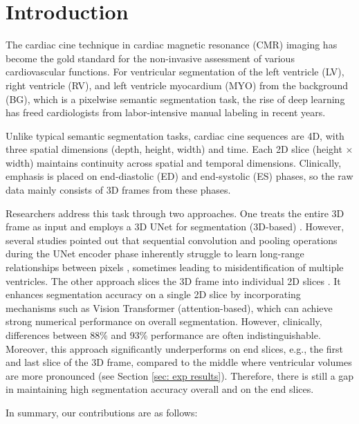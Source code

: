 \section{Introduction}
\label{sec:introduction}
The cardiac cine technique in cardiac magnetic resonance (CMR) imaging has become the gold standard for the non-invasive assessment of various cardiovascular functions\cite{ismail2022role}. For ventricular segmentation of the left ventricle (LV), right ventricle (RV), and left ventricle myocardium (MYO) from the background (BG), which is a pixelwise semantic segmentation task, the rise of deep learning has freed cardiologists from labor-intensive manual labeling in recent years.

Unlike typical semantic segmentation tasks, cardiac cine sequences are 4D, with three spatial dimensions (depth, height, width) and time. Each 2D slice (height × width) maintains continuity across spatial and temporal dimensions. Clinically, emphasis is placed on end-diastolic (ED) and end-systolic (ES) phases, so the raw data mainly consists of 3D frames from these phases.

Researchers address this task through two approaches. One treats the entire 3D frame as input and employs a 3D UNet for segmentation (3D-based) \cite{isensee2018automatic,patravali20182d}. However, several studies pointed out that sequential convolution and pooling operations during the UNet encoder phase inherently struggle to learn long-range relationships between pixels \cite{yan2022after, ruan2024vm}, sometimes leading to misidentification of multiple ventricles. The other approach slices the 3D frame into individual 2D slices \cite{chen2021transunet,cao2022swin,sun2020saunet,rahman2024multi,tragakis2023fully}. It enhances segmentation accuracy on a single 2D slice by incorporating mechanisms such as Vision Transformer (attention-based), which can achieve strong numerical performance on overall segmentation. However, clinically, differences between 88\% and 93\% performance are often indistinguishable. Moreover, this approach significantly underperforms on end slices, e.g., the first and last slice of the 3D frame, compared to the middle where ventricular volumes are more pronounced (see Section \ref{sec: exp results}). Therefore, there is still a gap in maintaining high segmentation accuracy overall and on the end slices.

In summary, our contributions are as follows:

